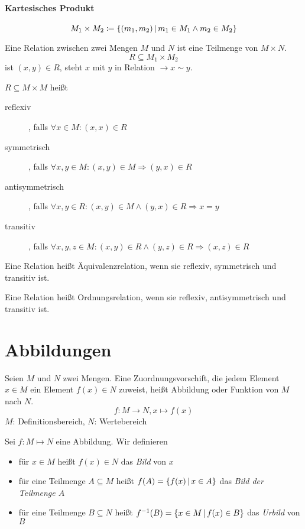 \paragraph{Kartesisches Produkt}
\begin{equation*}
  M_1 \times M_2 \coloneqq \left\{ (m_1, m_2) \,\middle|\, m_1\in M_1 \wedge m_2\in M_2 \right\}
\end{equation*}

Eine Relation zwischen zwei Mengen $M$ und $N$ ist eine Teilmenge von $M\times N$.
\begin{equation*}
  R\subseteq M_1\times M_2
\end{equation*}
ist $(x, y) \in R$, steht $x$ mit $y$ in Relation $\rightarrow x\sim y$.

$R \subseteq M\times M$ heißt
\begin{description}
  \item[reflexiv], falls $\forall x\in M : (x,x)\in R$
  \item[symmetrisch], falls $\forall x,y \in M : (x,y)\in M \Rightarrow (y,x) \in R$
  \item[antisymmetrisch], falls $\forall x,y \in R : (x,y)\in M \wedge (y,x)\in R \Rightarrow x=y$
  \item[transitiv], falls $\forall x,y,z \in M : (x,y)\in R \wedge (y,z)\in R \Rightarrow (x,z)\in R$
\end{description}

Eine Relation heißt Äquivalenzrelation, wenn sie reflexiv, symmetrisch und transitiv ist.

Eine Relation heißt Ordnungsrelation, wenn sie reflexiv, antisymmetrisch und transitiv ist.

\section{Abbildungen}
Seien $M$ und $N$ zwei Mengen. Eine Zuordnungsvorschift, die jedem Element $x\in M$ ein Element $f(x)\in N$ zuweist, heißt Abbildung oder Funktion von $M$ nach $N$.
\begin{equation*}
  f:M\rightarrow N, x\mapsto f(x)
\end{equation*}
$M$: Definitionsbereich, $N$: Wertebereich

Sei $f:M\mapsto N$ eine Abbildung. Wir definieren
\begin{itemize}
  \item für $x\in M$ heißt $f(x)\in N$ das \emph{Bild} von $x$
  \item für eine Teilmenge $A\subseteq M$ heißt $f(A)=\left\{ f(x) \,\middle|\, x\in A \right\}$ das \emph{Bild der Teilmenge  $A$}
  \item für eine Teilmenge $B\subseteq N$ heißt $f^{-1}(B) = \left\{ x\in M \,\middle|\, f(x)\in B \right\}$ das \emph{Urbild} von $B$
\end{itemize}

